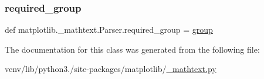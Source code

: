 \subsubsection{\texorpdfstring{required\+\_\+group}{required\_group}}
{\footnotesize\ttfamily def matplotlib.\+\_\+mathtext.\+Parser.\+required\+\_\+group = \hyperlink{classmatplotlib_1_1__mathtext_1_1Parser_ace87af37200466779f925c78cd9bab49}{group}\hspace{0.3cm}{\ttfamily [static]}}



The documentation for this class was generated from the following file\+:\begin{DoxyCompactItemize}
\item 
venv/lib/python3./site-\/packages/matplotlib/\hyperlink{__mathtext_8py}{\+\_\+mathtext.\+py}\end{DoxyCompactItemize}
